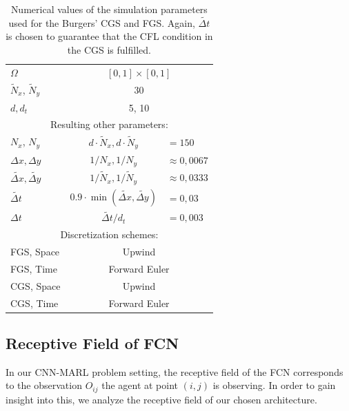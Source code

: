 \begin{table}[!ht]
\caption{Numerical values of the simulation parameters used for the Burgers' CGS and FGS. Again, $\widetilde{\Delta t}$ is chosen to guarantee that the CFL condition in the CGS is fulfilled.}
\vskip 0.15in
\centering
\begin{tabular}{@{}l|c|l@{}}
\toprule
$\Omega$ & \multicolumn{2}{c}{$[0, 1] \times [0, 1]$} \\ 
$\tilde N_x$, $\tilde N_y$ & \multicolumn{2}{c}{30}  \\ 
$d, d_t$ &  \multicolumn{2}{c}{5, 10}\\ 
\bottomrule
\multicolumn{3}{c}{Resulting other parameters:}  \\
\toprule
$ N_x$, $ N_y$ &   $d\cdot\tilde N_x,d\cdot \tilde N_y$ & $=150$ \\ 
$\Delta x, \Delta y$ &  $1/N_{x},1/N_y$ & $\approx 0,0067$  \\ 
$\widetilde{\Delta x}, \widetilde{\Delta y}$ &  $1/{\tilde N_{x}}, 1/{\tilde N_y}$ & $\approx 0,0333$   \\
$\widetilde{\Delta t}$ &  $0.9 \cdot \min(\widetilde{\Delta x}, \widetilde{\Delta y})$ & $ = 0,03$  \\
${\Delta t}$ &  $\widetilde{\Delta t}/{d_t}$ & $ = 0,003$  \\ 
\bottomrule
\multicolumn{3}{c}{Discretization schemes:}  \\
\toprule
FGS, Space & \multicolumn{2}{c}{Upwind} \\
FGS, Time & \multicolumn{2}{c}{Forward Euler} \\
CGS, Space & \multicolumn{2}{c}{Upwind} \\
CGS, Time & \multicolumn{2}{c}{Forward Euler} \\
\bottomrule
\end{tabular}
\label{tab:burgers_params}
\end{table}

\newpage
\subsection{Receptive Field of FCN}
In our CNN-MARL problem setting, the receptive field of the FCN corresponds to the observation $O_{ij}$ the agent at point $(i, j)$ is observing. In order to gain insight into this, we analyze the receptive field of our chosen architecture.

